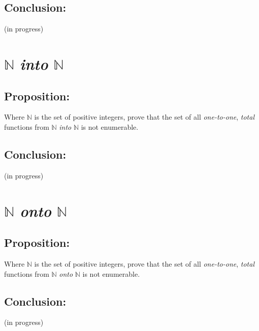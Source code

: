 \documentclass[a4paper,11pt]{article}
\begin{document}
	\subsection*{Conclusion:}
	(in progress)
	
\bigskip


\section{$\mathbb{N}$ \textit{into} $\mathbb{N}$}

	\subsection*{Proposition:}
	Where $\mathbb{N}$ is the set of positive integers, prove that the set of all \textit{one-to-one}, \textit{total}
	functions from $\mathbb{N}$ \textit{into} $\mathbb{N}$ is not enumerable.
	
	\bigskip
	
	\subsection*{Conclusion:}
	(in progress)


\section{$\mathbb{N}$ \textit{onto} $\mathbb{N}$}

	\subsection*{Proposition:}
	Where $\mathbb{N}$ is the set of positive integers, prove that the set of all \textit{one-to-one}, \textit{total}
	functions from $\mathbb{N}$ \textit{onto} $\mathbb{N}$ is not enumerable.
	
	\bigskip
	
	\subsection*{Conclusion:}	
	(in progress)
\end{document}
